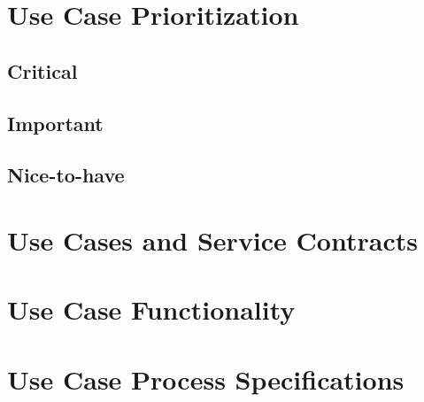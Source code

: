 \documentclass[11pt,fleqn]{book} %
\begin{document}

\chapter{Use Case Prioritization}
	\section{Critical}

	\section{Important}
	
	\section{Nice-to-have}
	
	


\chapter{Use Cases and Service Contracts}




\chapter{Use Case Functionality}




\chapter{Use Case Process Specifications}
\end{document}

